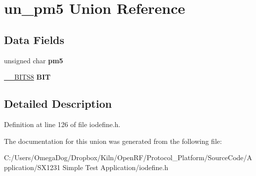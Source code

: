\hypertarget{unionun__pm5}{\section{un\-\_\-pm5 Union Reference}
\label{unionun__pm5}
}
\subsection*{Data Fields}
\begin{DoxyCompactItemize}
\item 
\hypertarget{unionun__pm5_a01a1ac5000895aaab72be35beb34379d}{unsigned char {\bfseries pm5}}\label{unionun__pm5_a01a1ac5000895aaab72be35beb34379d}

\item 
\hypertarget{unionun__pm5_a3b1dac432fcb5038e964ecd054b3799e}{\hyperlink{struct_____b_i_t_s8}{\-\_\-\-\_\-\-B\-I\-T\-S8} {\bfseries B\-I\-T}}\label{unionun__pm5_a3b1dac432fcb5038e964ecd054b3799e}

\end{DoxyCompactItemize}


\subsection{Detailed Description}


Definition at line 126 of file iodefine.\-h.



The documentation for this union was generated from the following file\-:\begin{DoxyCompactItemize}
\item 
C\-:/\-Users/\-Omega\-Dog/\-Dropbox/\-Kiln/\-Open\-R\-F/\-Protocol\-\_\-\-Platform/\-Source\-Code/\-Application/\-S\-X1231 Simple Test Application/iodefine.\-h\end{DoxyCompactItemize}
